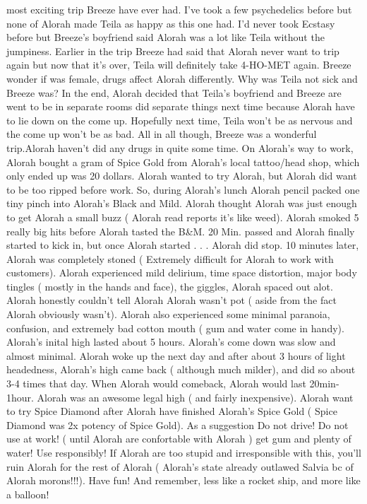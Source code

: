 \documentclass[12pt]{book}
\begin{document}
most exciting trip Breeze have ever had. I've took a few psychedelics before but none of Alorah made Teila as happy as this one had. I'd never took Ecstasy before but Breeze's boyfriend said Alorah was a lot like Teila without the jumpiness. Earlier in the trip Breeze had said that Alorah never want to trip again but now that it's over, Teila will definitely take 4-HO-MET again. Breeze wonder if was female, drugs affect Alorah differently. Why was Teila not sick and Breeze was? In the end, Alorah decided that Teila's boyfriend and Breeze are went to be in separate rooms did separate things next time because Alorah have to lie down on the come up. Hopefully next time, Teila won't be as nervous and the come up won't be as bad. All in all though, Breeze was a wonderful trip.Alorah haven't did any drugs in quite some time. On Alorah's way to work, Alorah bought a gram of Spice Gold from Alorah's local tattoo/head shop, which only ended up was 20 dollars. Alorah wanted to try Alorah, but Alorah did want to be too ripped before work. So, during Alorah's lunch Alorah pencil packed one tiny pinch into Alorah's Black and Mild. Alorah thought Alorah was just enough to get Alorah a small buzz ( Alorah read reports it's like weed). Alorah smoked 5 really big hits before Alorah tasted the B\&M. 20 Min. passed and Alorah finally started to kick in, but once Alorah started . . .  Alorah did stop. 10 minutes later, Alorah was completely stoned ( Extremely difficult for Alorah to work with customers). Alorah experienced mild delirium, time space distortion, major body tingles ( mostly in the hands and face), the giggles, Alorah spaced out alot. Alorah honestly couldn't tell Alorah Alorah wasn't pot ( aside from the fact Alorah obviously wasn't). Alorah also experienced some minimal paranoia, confusion, and extremely bad cotton mouth ( gum and water come in handy). Alorah's inital high lasted about 5 hours. Alorah's come down was slow and almost minimal. Alorah woke up the next day and after about 3 hours of light headedness, Alorah's high came back ( although much milder), and did so about 3-4 times that day. When Alorah would comeback, Alorah would last 20min-1hour. Alorah was an awesome legal high ( and fairly inexpensive). Alorah want to try Spice Diamond after Alorah have finished Alorah's Spice Gold ( Spice Diamond was 2x potency of Spice Gold). As a suggestion Do not drive! Do not use at work! ( until Alorah are confortable with Alorah ) get gum and plenty of water! Use responsibly! If Alorah are too stupid and irresponsible with this, you'll ruin Alorah for the rest of Alorah ( Alorah's state already outlawed Salvia bc of Alorah morons!!!). Have fun! And remember, less like a rocket ship, and more like a balloon!
\end{document}
